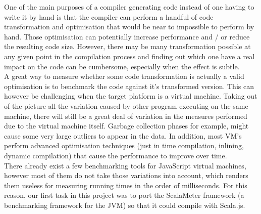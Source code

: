 One of the main purposes of a compiler generating code instead of one having to
write it by hand is that the compiler can perform a handful of code
transformation and optimisation that would be near to impossible to perform by
hand. Those optimisation can potentially increase performance and / or reduce
the resulting code size. However, there may be many transformation possible at
any given point in the compilation process and finding out which one have a
real impact on the code can be cumbersome, especially when the effect is
subtle.\\
A great way to measure whether some code transformation is actually a valid
optimisation is to benchmark the code against it's transformed version.
This can however be challenging when the target platform is a virtual machine.
Taking out of the picture all the variation caused by other program executing
on the same machine, there will still be a great deal of variation in the
measures performed due to the virtual machine itself. Garbage collection phases
for example, might cause some very large outliers to appear in the data. In
addition, most VM's perform advanced optimisation techniques (just in time
compilation, inlining, dynamic compilation) that cause the performance to
improve over time. \\
There already exist a few benchmarking tools for JavaScript virtual machines,
however most of them do not take those variations into account, which renders
them useless for measuring running times in the order of milliseconds. For this
reason, our first task in this project was to port the ScalaMeter framework (a
benchmarking framework for the JVM) so that it could compile with Scala.js.